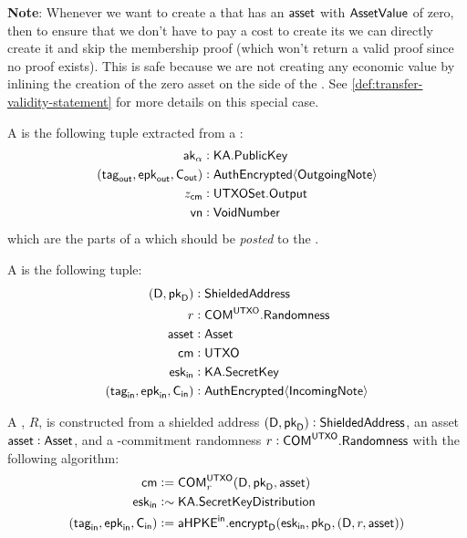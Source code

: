 \begin{definition}
    \textbf{Note}: Whenever we want to create a \Sender{} that has an ${\textsf{asset}}$ with ${\textsf{AssetValue}}$ of zero, then to ensure that we don't have to pay a cost to create its \UTXO{} we can directly create it and skip the \UTXOSet{} membership proof (which won't return a valid proof since no proof exists). This is safe because we are not creating any economic value by inlining the creation of the zero asset on the \Sender{} side of the \Transfer{}. See \ref{def:transfer-validity-statement} for more details on this special case.
\end{definition}

\begin{definition}
    A \SenderPost{} is the following tuple extracted from a \Sender{}:
    \begin{align*}
        {\textsf{ak}}_\alpha                &: {\textsf{KA}}.{\textsf{PublicKey}} \\
        ({{\textsf{tag}}_{\textsf{out}}}, {{\textsf{epk}}_{\textsf{out}}}, {\textsf{C}_\textsf{out}}) &: {\textsf{AuthEncrypted}}\langle{{\textsf{OutgoingNote}}}\rangle \\
        z_{\textsf{cm}}                     &: {\textsf{UTXOSet}}.{\textsf{Output}} \\
        {\textsf{vn}}                       &: {\textsf{VoidNumber}}
    \end{align*}
    which are the parts of a \Sender{} which should be \emph{posted} to the \Ledger{}.
\end{definition}

\begin{definition}
    A \Receiver{} is the following tuple:
    \begin{align*}
        (\textsf{D}, {{\textsf{pk}}_\textsf{D}})     &: {\textsf{ShieldedAddress}} \\
        r                      &: {\textsf{COM}}^{\textsf{UTXO}}.{\textsf{Randomness}} \\
        {\textsf{asset}}                 &: {\textsf{Asset}} \\
        {\textsf{cm}}                    &: {\textsf{UTXO}} \\
        {{\textsf{esk}}_\textsf{in}}                 &: {\textsf{KA}}.{\textsf{SecretKey}} \\
        ({{\textsf{tag}}_\textsf{in}}, {{\textsf{epk}}_\textsf{in}}, {\textsf{C}_\textsf{in}}) &: {\textsf{AuthEncrypted}}\langle{{\textsf{IncomingNote}}}\rangle
    \end{align*}
    
    A \Receiver{}, $R$, is constructed from a shielded address $(\textsf{D}, {{\textsf{pk}}_\textsf{D}}) : {\textsf{ShieldedAddress}}$, an asset ${\textsf{asset}} : {\textsf{Asset}}$, and a \UTXO{}-commitment randomness $r : {\textsf{COM}}^{\textsf{UTXO}}.{\textsf{Randomness}}$ with the following algorithm:
    \begin{align*}
        {\textsf{cm}}                    &:= {\textsf{COM}}^{{\textsf{UTXO}}}_r(\textsf{D}, {{\textsf{pk}}_\textsf{D}}, {\textsf{asset}}) \\
        {{\textsf{esk}}_\textsf{in}}                 &:\sim {\textsf{KA}}.{\textsf{SecretKeyDistribution}} \\
        ({{\textsf{tag}}_\textsf{in}}, {{\textsf{epk}}_\textsf{in}}, {\textsf{C}_\textsf{in}}) &:= {{\textsf{aHPKE}}^\textsf{in}}.{\textsf{encrypt}}_\textsf{D}({{\textsf{esk}}_\textsf{in}}, {{\textsf{pk}}_\textsf{D}}, (\textsf{D}, r, {\textsf{asset}}))
    \end{align*}
\end{definition}

